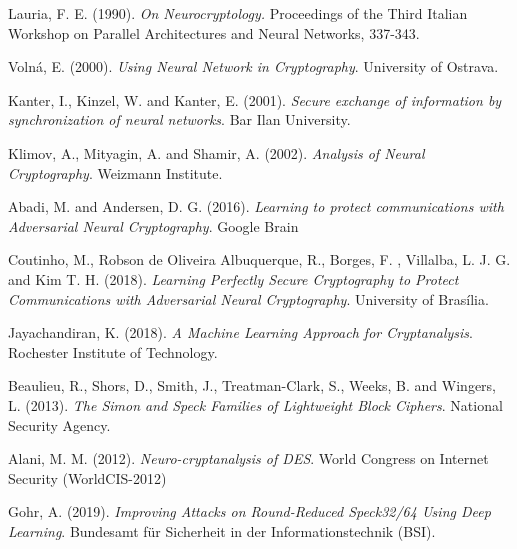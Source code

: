 \documentclass{beamer}
\begin{document}
\begin{frame}
\begin{thebibliography}{99}
 {\sc Lauria, F. E.} (1990). \textit{On Neurocryptology.} Proceedings of the Third Italian Workshop on Parallel Architectures and Neural Networks, 337-343.

 {\sc Volná, E.} (2000). \textit{Using Neural Network in Cryptography}. University of Ostrava.

 {\sc Kanter, I.}, {\sc Kinzel, W.} and {\sc Kanter, E.} (2001). \textit{Secure exchange of information by synchronization of neural networks}. Bar Ilan University.

 {\sc Klimov, A.}, {\sc Mityagin, A.} and {\sc Shamir, A.} (2002). \textit{Analysis of Neural Cryptography}. Weizmann Institute.


 {\sc Abadi, M.} and {\sc Andersen, D. G.} (2016). \textit{Learning to protect communications with Adversarial Neural Cryptography}. Google Brain

\end{thebibliography}
\end{frame}

\begin{frame}
\begin{thebibliography}{99}
 {\sc Coutinho, M.}, {\sc Robson de Oliveira Albuquerque, R.}, {\sc Borges, F. }, {\sc Villalba, L. J. G.} and  {\sc Kim T. H.} (2018). \textit{Learning Perfectly Secure Cryptography to Protect Communications with Adversarial Neural Cryptography}. University of Brasília.

 {\sc Jayachandiran, K.} (2018). \textit{A Machine Learning Approach for Cryptanalysis}. Rochester Institute of Technology.

 {\sc Beaulieu, R.}, {\sc Shors, D.}, {\sc Smith, J.}, {\sc Treatman-Clark, S.}, {\sc Weeks, B.} and {\sc Wingers, L.} (2013). \textit{The Simon and Speck Families of Lightweight Block Ciphers}. National Security Agency.

 {\sc Alani, M. M.} (2012). \textit{Neuro-cryptanalysis of DES}. World Congress on Internet Security (WorldCIS-2012)

 {\sc Gohr, A.} (2019). \textit{Improving Attacks on Round-Reduced Speck32/64 Using Deep Learning}. Bundesamt für Sicherheit in der Informationstechnik (BSI).



\end{thebibliography}
\end{frame}
\end{document}
